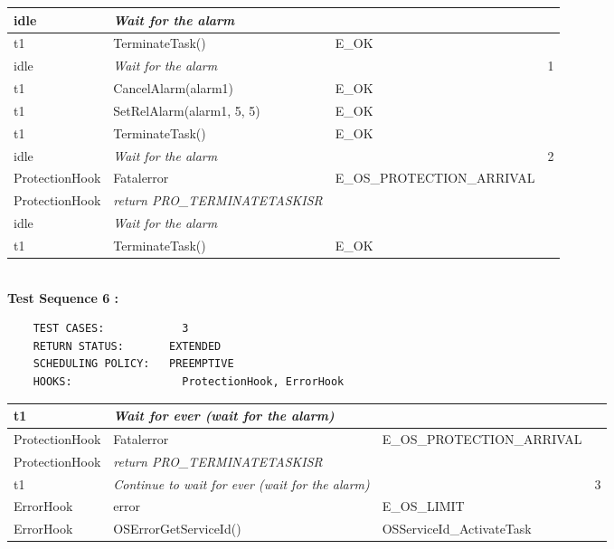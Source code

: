 \documentclass[10pt]{article}
\newlength{\Li}\settowidth{\Li}{Running}
\newlength{\Lii}\setlength{\Lii}{7cm}
\newlength{\Liiii}\setlength{\Liiii}{0.9cm}
\newlength{\Liii}\setlength{\Liii}{\textwidth} \addtolength{\Liii}{-\Li} \addtolength{\Liii}{-\Lii} \addtolength{\Liii}{-\Liiii}
\begin{document}
	\begin{supertabular}{|p{\Li}|p{\Lii}|p{\Liii}|p{\Liiii}|} \hline 
	idle	& \textit{Wait for the alarm}					& 												& \\ \hline
	t1	& TerminateTask()							& E\_OK											& \\ \hline
	idle	& \textit{Wait for the alarm}							& 										& 1 \\ \hline
	t1	& CancelAlarm(alarm1)						& E\_OK											& \\ \hline
	t1	& SetRelAlarm(alarm1, 5, 5)					& E\_OK											& \\ \hline
	t1	& TerminateTask()							& E\_OK											& \\ \hline
	idle	& \textit{Wait for the alarm}							& 										& 2 \\ \hline
	ProtectionHook		& Fatalerror					& E\_OS\_PROTECTION\_ARRIVAL						& \\ \hline
	ProtectionHook		& \textit{return PRO\_TERMINATETASKISR}	& 										& \\ \hline
	idle	& \textit{Wait for the alarm}							& 										& \\ \hline
	t1	& TerminateTask()							& E\_OK											& \\ \hline	
	\end{supertabular}\\

	\textbf{Test Sequence 6 :}
	\begin{lstlisting}
	TEST CASES:		       3
	RETURN STATUS:	  	 EXTENDED
	SCHEDULING POLICY:   PREEMPTIVE
	HOOKS:		           ProtectionHook, ErrorHook
	\end{lstlisting}
	

	\begin{supertabular}{|p{\Li}|p{\Lii}|p{\Liii}|p{\Liiii}|} \hline 
	t1	& \textit{Wait for ever (wait for the alarm)}					& 										& \\ \hline
	ProtectionHook		& Fatalerror					& E\_OS\_PROTECTION\_ARRIVAL						& \\ \hline
	ProtectionHook		& \textit{return PRO\_TERMINATETASKISR}	& 										& \\ \hline
	t1	& \textit{Continue to wait for ever (wait for the alarm)}		& 										& 3 \\ \hline
	ErrorHook			& error								& E\_OS\_LIMIT							& \\ \hline
	ErrorHook			& OSErrorGetServiceId()					& OSServiceId\_ActivateTask					& \\ \hline
	\end{supertabular}\\	
	
\end{document}
